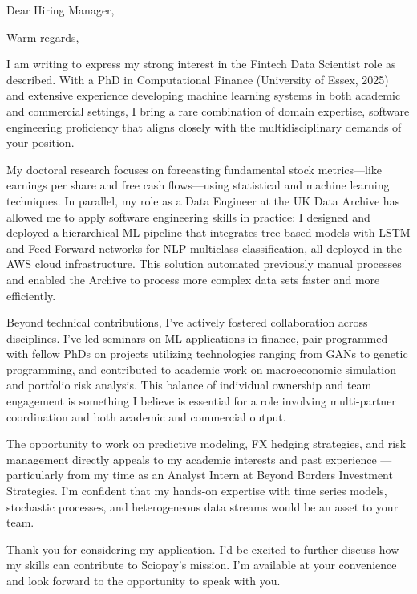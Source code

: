 \documentclass[11pt,a4paper,sans]{moderncv}
\newcommand{\positionname}{Fintech Data Scientist }
\begin{document}
\date{\today}
\opening{Dear Hiring Manager,}
\closing{Warm regards,}

\makelettertitle

I am writing to express my strong interest in the \positionname role as described. With a PhD in Computational Finance (University of Essex, 2025) and extensive experience developing machine learning systems in both academic and commercial settings, I bring a rare combination of domain expertise, software engineering proficiency that aligns closely with the multidisciplinary demands of your position.

My doctoral research focuses on forecasting fundamental stock metrics—like earnings per share and free cash flows—using statistical and machine learning techniques. 
In parallel, my role as a Data Engineer at the UK Data Archive has allowed me to apply software engineering skills in practice: I designed and deployed a hierarchical ML pipeline that integrates tree-based models with LSTM and Feed-Forward networks for NLP multiclass classification, all deployed in the AWS cloud infrastructure. 
This solution automated previously manual processes and enabled the Archive to process more complex data sets faster and more efficiently.

Beyond technical contributions, I’ve actively fostered collaboration across disciplines. I’ve led seminars on ML applications in finance, pair-programmed with fellow PhDs on projects utilizing technologies ranging from GANs to genetic programming, and contributed to academic work on macroeconomic simulation and portfolio risk analysis.
This balance of individual ownership and team engagement is something I believe is essential for a role involving multi-partner coordination and both academic and commercial output.

The opportunity to work on predictive modeling, FX hedging strategies, and risk management directly appeals to my academic interests and past experience --- particularly from my time as an Analyst Intern at Beyond Borders Investment Strategies.
I’m confident that my hands-on expertise with time series models, stochastic processes, and heterogeneous data streams would be an asset to your team.

Thank you for considering my application. 
I’d be excited to further discuss how my skills can contribute to Sciopay’s mission. I’m available at your convenience and look forward to the opportunity to speak with you.

\makeletterclosing
\end{document}
